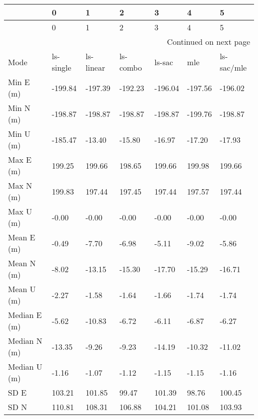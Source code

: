 \begin{longtable}{lllllll}
\toprule
{} &          0 &          1 &         2 &        3 &        4 &           5 \\
\midrule
\endfirsthead

\toprule
{} &          0 &          1 &         2 &        3 &        4 &           5 \\
\midrule
\endhead
\midrule
\multicolumn{7}{r}{{Continued on next page}} \\
\midrule
\endfoot

\bottomrule
\endlastfoot
Mode              &  ls-single &  ls-linear &  ls-combo &   ls-sac &      mle &  ls-sac/mle \\
Min E (m)         &    -199.84 &    -197.39 &   -192.23 &  -196.04 &  -197.56 &     -196.02 \\
Min N (m)         &    -198.87 &    -198.87 &   -198.87 &  -198.87 &  -199.76 &     -198.87 \\
Min U (m)         &    -185.47 &     -13.40 &    -15.80 &   -16.97 &   -17.20 &      -17.93 \\
Max E (m)         &     199.25 &     199.66 &    198.65 &   199.66 &   199.98 &      199.66 \\
Max N (m)         &     199.83 &     197.44 &    197.45 &   197.44 &   197.57 &      197.44 \\
Max U (m)         &      -0.00 &      -0.00 &     -0.00 &    -0.00 &    -0.00 &       -0.00 \\
Mean E (m)        &      -0.49 &      -7.70 &     -6.98 &    -5.11 &    -9.02 &       -5.86 \\
Mean N (m)        &      -8.02 &     -13.15 &    -15.30 &   -17.70 &   -15.29 &      -16.71 \\
Mean U (m)        &      -2.27 &      -1.58 &     -1.64 &    -1.66 &    -1.74 &       -1.74 \\
Median E (m)      &      -5.62 &     -10.83 &     -6.72 &    -6.11 &    -6.87 &       -6.27 \\
Median N (m)      &     -13.35 &      -9.26 &     -9.23 &   -14.19 &   -10.32 &      -11.02 \\
Median U (m)      &      -1.16 &      -1.07 &     -1.12 &    -1.15 &    -1.15 &       -1.16 \\
SD E              &     103.21 &     101.85 &     99.47 &   101.39 &    98.76 &      100.45 \\
SD N              &     110.81 &     108.31 &    106.88 &   104.21 &   101.08 &      103.93 \\

\end{longtable}
